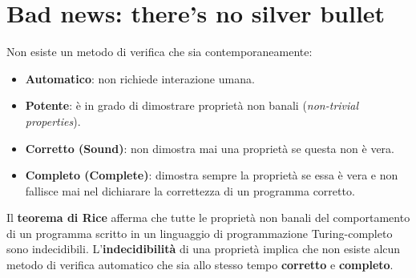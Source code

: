 \section*{Bad news: there’s no silver bullet}

Non esiste un metodo di verifica che sia contemporaneamente:
\begin{itemize}
    \item \textbf{Automatico}: non richiede interazione umana.
    \item \textbf{Potente}: è in grado di dimostrare proprietà non banali (\emph{non-trivial properties}).
    \item \textbf{Corretto (Sound)}: non dimostra mai una proprietà se questa non è vera.
    \item \textbf{Completo (Complete)}: dimostra sempre la proprietà se essa è vera e non fallisce mai nel dichiarare la correttezza di un programma corretto.
\end{itemize}

Il \textbf{teorema di Rice} afferma che tutte le proprietà non banali del
comportamento di un programma scritto in un linguaggio di programmazione
Turing-completo sono indecidibili.
L'\textbf{indecidibilità} di una proprietà implica che non esiste alcun metodo
di verifica automatico che sia allo stesso tempo \textbf{corretto} e
\textbf{completo}.